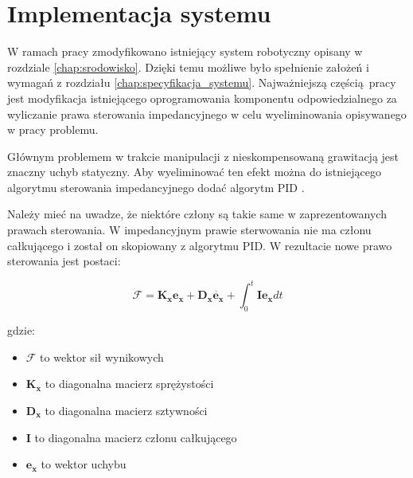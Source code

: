 
\chapter{Implementacja systemu\label{chap:implementacja_systemu}}
W ramach pracy zmodyfikowano istniejący system robotyczny opisany w rozdziale \ref{chap:srodowisko}. Dzięki temu możliwe było spełnienie założeń i wymagań z rozdziału \ref{chap:specyfikacja_systemu}.  Najważniejszą częścią pracy jest modyfikacja istniejącego oprogramowania komponentu odpowiedzialnego za wyliczanie prawa sterowania impedancyjnego w celu wyeliminowania opisywanego w pracy problemu.


Głównym problemem w trakcie manipulacji z nieskompensowaną grawitacją jest znaczny uchyb statyczny. Aby wyeliminować ten efekt można do istniejącego algorytmu sterowania impedancyjnego dodać algorytm PID \cite{bib:gravity2}. 

Należy mieć na uwadze, że niektóre człony są takie same w zaprezentowanych prawach sterowania. W impedancyjnym prawie sterwowania nie ma członu całkującego i został on skopiowany z algorytmu PID. W rezultacie nowe prawo sterowania jest postaci:

\begin{equation}
\boldsymbol{\mathcal{F}} = \boldsymbol{K_x}\boldsymbol{e_x} + \boldsymbol{D_x}\dot{\boldsymbol{e_x}} + \int_{0}^{t}  \boldsymbol{I}\boldsymbol{e_x}dt
\end{equation}

gdzie:
\begin{itemize}
    \item $\boldsymbol{\mathcal{F}}$ to wektor sił wynikowych
    \item $\boldsymbol{K_x}$ to diagonalna macierz sprężystości
    \item $\boldsymbol{D_x}$ to diagonalna macierz sztywności
    \item $\boldsymbol{I}$ to diagonalna macierz członu całkującego
    \item $\boldsymbol{e_x}$ to wektor uchybu
\end{itemize}
